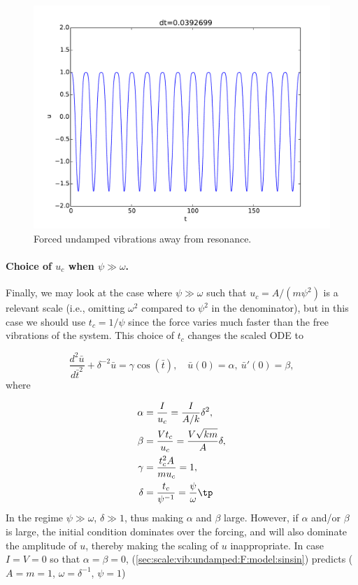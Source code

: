 \documentclass[graybox,envcountchap,sectrefs,final]{svmonodo}
\begin{document}
\begin{figure}[!ht]  %
  \centerline{\includegraphics[width=1.0\linewidth]{fig-scaling/vib_delta05_b0_Fcos.pdf}}
  \caption{
  Forced undamped vibrations away from resonance. \label{sec:scale:vib:fig:Fcos_b0:2}
  }
\end{figure}


\paragraph{Choice of $u_c$ when $\psi\gg\omega$.}
Finally, we may look at the case where $\psi\gg\omega$ such that
$u_c=A/(m\psi^2)$ is a relevant scale (i.e., omitting $\omega^2$ compared to
$\psi^2$ in the denominator), but in this case we should
use $t_c=1/\psi$ since the force varies much faster than the
free vibrations of the system.
This choice of $t_c$ changes the scaled ODE to

\begin{equation}
\frac{d^2\bar u}{d\bar t^2} + \delta^{-2}\bar u =
\gamma
\cos(\bar t),
\quad \bar u(0)=\alpha,\ \bar u'(0)=\beta,
\label{sec:scale:vib:undamped:F:model:scaled6}
\end{equation}
where

\begin{align*}
\alpha &= \frac{I}{u_c} = \frac{I}{A/k}\delta^2,\\ 
\beta  &= \frac{Vt_c}{u_c} = \frac{V\sqrt{km}}{A}\delta,\\ 
\gamma &= \frac{t_c^2 A}{mu_c} = 1,\\ 
\delta &= \frac{t_c}{\psi^{-1}} = \frac{\psi}{\omega}\tp
\end{align*}
In the regime $\psi\gg\omega$, $\delta\gg 1$, thus making $\alpha$ and
$\beta$ large.
However, if $\alpha$ and/or $\beta$ is large,
the initial condition dominates over the forcing, and will also dominate
the amplitude of $u$, thereby making the scaling of $u$ inappropriate.
In case $I=V=0$ so that $\alpha=\beta=0$,
(\ref{sec:scale:vib:undamped:F:model:sinsin}) predicts
($A=m=1$, $\omega=\delta^{-1}$, $\psi=1$)
\end{document}

